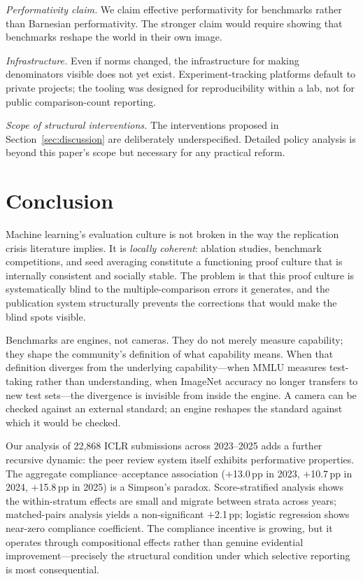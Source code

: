 \documentclass{article}
\begin{document}
\textit{Performativity claim.} We claim effective performativity for benchmarks rather than Barnesian performativity. The stronger claim would require showing that benchmarks reshape the world in their own image.

\textit{Infrastructure.} Even if norms changed, the infrastructure for making denominators visible does not yet exist. Experiment-tracking platforms default to private projects; the tooling was designed for reproducibility within a lab, not for public comparison-count reporting.

\textit{Scope of structural interventions.} The interventions proposed in Section~\ref{sec:discussion} are deliberately underspecified. Detailed policy analysis is beyond this paper's scope but necessary for any practical reform.

\section{Conclusion}

Machine learning's evaluation culture is not broken in the way the replication crisis literature implies. It is \textit{locally coherent}: ablation studies, benchmark competitions, and seed averaging constitute a functioning proof culture that is internally consistent and socially stable. The problem is that this proof culture is systematically blind to the multiple-comparison errors it generates, and the publication system structurally prevents the corrections that would make the blind spots visible.

Benchmarks are engines, not cameras. They do not merely measure capability; they shape the community's definition of what capability means. When that definition diverges from the underlying capability---when MMLU measures test-taking rather than understanding, when ImageNet accuracy no longer transfers to new test sets---the divergence is invisible from inside the engine. A camera can be checked against an external standard; an engine reshapes the standard against which it would be checked.

Our analysis of 22,868 ICLR submissions across 2023--2025 adds a further recursive dynamic: the peer review system itself exhibits performative properties. The aggregate compliance--acceptance association ($+$13.0\,pp in 2023, $+$10.7\,pp in 2024, $+$15.8\,pp in 2025) is a Simpson's paradox. Score-stratified analysis shows the within-stratum effects are small and migrate between strata across years; matched-pairs analysis yields a non-significant $+$2.1\,pp; logistic regression shows near-zero compliance coefficient. The compliance incentive is growing, but it operates through compositional effects rather than genuine evidential improvement---precisely the structural condition under which selective reporting is most consequential.
\end{document}
